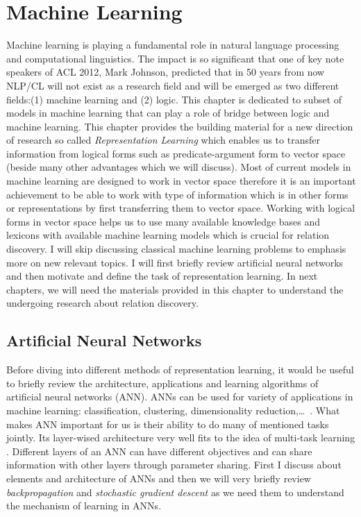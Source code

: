 \chapter{Machine Learning}
Machine learning is playing a fundamental role in natural language processing
and computational linguistics. The impact is so significant that one of key note
speakers of ACL 2012, Mark Johnson, predicted that in 50 years from now NLP/CL
will not exist as a research field and will be emerged as two different
fields:(1) machine learning and (2) logic. This chapter is dedicated  to subset
of models in machine learning that can play a role of bridge between logic and
machine learning. This chapter provides the building material for a new
direction of research so called \textit{Representation Learning} which enables
us to transfer information from logical forms such as predicate-argument form to
vector space (beside many other advantages which we will discuss).
Most of current models in machine learning are designed to work in vector space
therefore it is an important achievement to be able to work with type of
information which is in other forms or representations by first transferring
them to vector space. Working with logical forms in vector space helps us to use
many available knowledge bases and lexicons with available machine learning
models which is crucial for relation discovery. I will skip discussing classical
machine learning problems to emphasis more on new relevant topics. 
I will first briefly review artificial neural networks and then motivate and
define the task of representation learning. In next chapters, we will
need the materials provided in this chapter to understand the undergoing
research about relation discovery.
\section{Artificial Neural Networks}
\label{sec:ml-ann}
Before diving into different methods of representation learning, it would be
useful to briefly review the architecture, applications and learning algorithms
of artificial neural networks (ANN). ANNs can be used for variety of
applications in machine learning: classification, clustering, dimensionality
reduction,\ldots ~. What makes ANN important for us is their ability to do many
of mentioned tasks jointly. Its layer-wised architecture very well fits to the
idea of multi-task learning \cite{Bengio2012a}. Different layers of an ANN can
have different objectives and can share information with other layers through parameter
sharing. First I discuss about elements and architecture of ANNs and then we
will very briefly review \textit{backpropagation} and \textit{stochastic
gradient descent} as we need them to understand the mechanism of learning in
ANNs.

